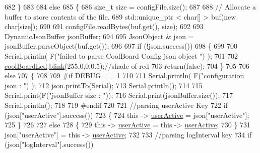 \begin{DoxyCode}
682     \}
683 
684     \textcolor{keywordflow}{else}
685     \{
686         \textcolor{keywordtype}{size\_t} size = configFile.size();
687 
688         \textcolor{comment}{// Allocate a buffer to store contents of the file.}
689         std::unique\_ptr < char[] > buf(\textcolor{keyword}{new} \textcolor{keywordtype}{char}[size]);
690 
691         configFile.readBytes(buf.get(), size);
692 
693         DynamicJsonBuffer jsonBuffer;
694 
695         JsonObject & json = jsonBuffer.parseObject(buf.get());
696 
697         \textcolor{keywordflow}{if} (!json.success())
698         \{
699         
700             Serial.println( F(\textcolor{stringliteral}{"failed to parse CoolBoard Config json object "}) );
701     
702             \hyperlink{class_cool_board_a1b1d3c684a5baa56b08486e192fd8e97}{coolBoardLed}.\hyperlink{class_cool_board_led_a96e1ea13003eee34c9dbcef340404426}{blink}(255,0,0,0.5);\textcolor{comment}{//shade of red     }
703             \textcolor{keywordflow}{return}(\textcolor{keyword}{false});
704         \}
705 
706         \textcolor{keywordflow}{else}
707         \{   
708         
709 \textcolor{preprocessor}{        #if DEBUG == 1}
710             
711             Serial.println( F(\textcolor{stringliteral}{"configuration json : "}) );
712             json.printTo(Serial);
713             Serial.println();
714             
715             Serial.print(F(\textcolor{stringliteral}{"jsonBuffer size : "}));
716             Serial.print(jsonBuffer.size());
717             Serial.println();
718 
719 \textcolor{preprocessor}{        #endif}
720             
721             \textcolor{comment}{//parsing userActive Key}
722             \textcolor{keywordflow}{if} (json[\textcolor{stringliteral}{"userActive"}].success())
723             \{
724                 \textcolor{keyword}{this} -> \hyperlink{class_cool_board_a6395459131d6889a3005f79c7a35e964}{userActive} = json[\textcolor{stringliteral}{"userActive"}];
725             \}
726 
727             \textcolor{keywordflow}{else}
728             \{
729                 \textcolor{keyword}{this} -> \hyperlink{class_cool_board_a6395459131d6889a3005f79c7a35e964}{userActive} = \textcolor{keyword}{this} -> \hyperlink{class_cool_board_a6395459131d6889a3005f79c7a35e964}{userActive};
730             \}
731             json[\textcolor{stringliteral}{"userActive"}] = \textcolor{keyword}{this} -> \hyperlink{class_cool_board_a6395459131d6889a3005f79c7a35e964}{userActive};
732 
733             \textcolor{comment}{//parsing logInterval key}
734             \textcolor{keywordflow}{if} (json[\textcolor{stringliteral}{"logInterval"}].success())

\end{DoxyCode}
